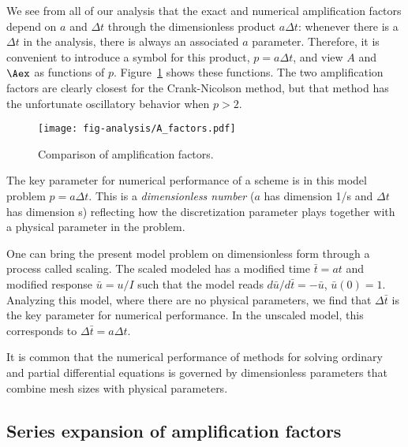 \documentclass[graybox,sectrefs,envcountresetchap,open=right,final]{svmonodo}
\newenvironment{notice_mdfboxadmon}[1][]{
\begin{notice_mdfboxmdframed}[frametitle=#1]
}
{
\end{notice_mdfboxmdframed}
}
\begin{document}
We see from all of our analysis
that the exact and numerical amplification factors depend
on $a$ and $\Delta t$ through the dimensionless
product $a\Delta t$: whenever there is a
$\Delta t$ in the analysis, there is always an associated $a$
parameter. Therefore, it
is convenient to introduce a symbol for this product, $p=a\Delta t$,
and view $A$ and $\Aex$ as functions of $p$. Figure~\ref{decay:analysis:fig:A} shows these functions. The two amplification
factors are clearly closest for the
Crank-Nicolson method, but that method has
the unfortunate oscillatory behavior when $p>2$.


\begin{figure}[!ht]  %
  \centerline{\texttt{[image: fig-analysis/A\_factors.pdf]}}
  \caption{
  Comparison of amplification factors. \label{decay:analysis:fig:A}
  }
\end{figure}




\begin{notice_mdfboxadmon}[Significance of the $p=a\Delta t$ parameter]
The key parameter for numerical performance of a scheme is in this model
problem $p=a\Delta t$. This is a \emph{dimensionless number} ($a$ has dimension
1/s and $\Delta t$ has dimension s) reflecting how the discretization
parameter plays together with a physical parameter in the problem.

One can bring the present model problem on dimensionless form
through a process called scaling. The scaled modeled has a modified
time $\bar t = at$ and modified response $\bar u =u/I$ such that
the model reads $d\bar u/d\bar t = -\bar u$, $\bar u(0)=1$.
Analyzing this model, where there are no physical parameters,
we find that $\Delta \bar t$ is the key parameter
for numerical performance. In the unscaled model,
this corresponds to $\Delta \bar t = a\Delta t$.

It is common that the numerical performance of methods for solving ordinary and
partial differential equations is governed by dimensionless parameters
that combine mesh sizes with physical parameters.
\end{notice_mdfboxadmon}



\subsection{Series expansion of amplification factors}
\end{document}
